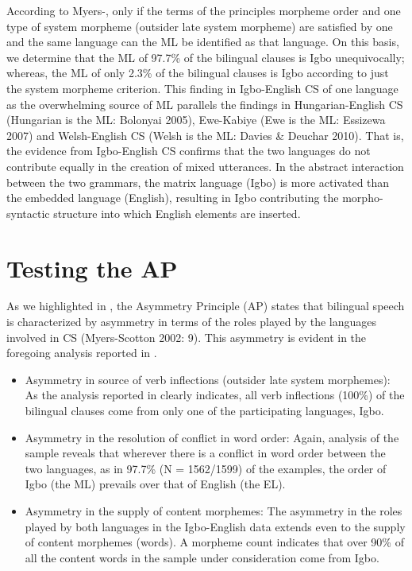 \documentclass[output=paper]{langsci/langscibook}
\begin{document}
According to Myers-\citet[59]{Scotton2002}, only if the terms of the principles morpheme order and one type of system morpheme (outsider late system morpheme) are satisfied by one and the same language can the ML be identified as that language. On this basis, we determine that the ML of 97.7\% of the bilingual clauses is Igbo unequivocally; whereas, the ML of only 2.3\% of the bilingual clauses is Igbo according to just the system morpheme criterion. This finding in Igbo-English CS of one language as the overwhelming source of ML parallels the findings in Hungarian-English CS (Hungarian is the ML: Bolonyai 2005), Ewe-Kabiye (Ewe is the ML: Essizewa 2007) and Welsh-English CS (Welsh is the ML: Davies \& Deuchar 2010). That is, the evidence from Igbo-English CS confirms that the two languages do not contribute equally in the creation of mixed utterances. In the abstract interaction between the two grammars, the matrix language (Igbo) is more activated than the embedded language (English), resulting in Igbo contributing the morpho-syntactic structure into which English elements are inserted.  

\section{Testing the AP}

As we highlighted in , the Asymmetry Principle (AP) states that bilingual speech is characterized by asymmetry in terms of the roles played by the languages involved in CS (Myers-Scotton 2002: 9). This asymmetry is evident in the foregoing analysis reported in . 

\begin{itemize}
 \item Asymmetry in source of verb inflections (outsider late system morphemes): As the analysis reported in  clearly indicates, all verb inflections (100\%) of the bilingual clauses come from only one of the participating languages, Igbo.

 \item Asymmetry in the resolution of conflict in word order: Again, analysis of the sample reveals that wherever there is a conflict in word order between the two languages, as in 97.7\% (N = 1562/1599) of the examples, the order of Igbo (the ML) prevails over that of English (the EL). 

 \item Asymmetry in the supply of content morphemes: The asymmetry in the roles played by both languages in the Igbo-English data extends even to the supply of content morphemes (words). A morpheme count indicates that over 90\% of all the content words in the sample under consideration come from Igbo.
 
\end{itemize}
 
\end{document}
